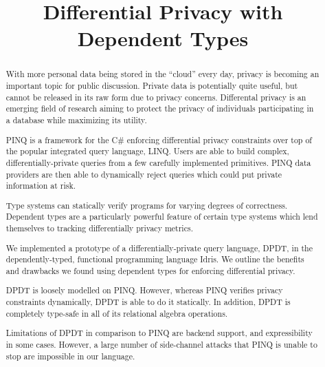 \documentclass[12pt]{report}
\title{Differential Privacy with Dependent Types}
\begin{document}
\maketitle



\graphicspath{{assets/}}

\begin{abstract}
With more personal data being stored in the ``cloud'' every day, privacy is becoming an important topic for public discussion.
Private data is potentially quite useful, but cannot be released in its raw form due to privacy concerns.
Differental privacy is an emerging field of research aiming to protect the privacy of individuals participating in a database while maximizing its utility.

PINQ is a framework for the C\# enforcing differential privacy constraints over top of the popular integrated query language, LINQ.
Users are able to build complex, differentially-private queries from a few carefully implemented primitives.
PINQ data providers are then able to dynamically reject queries which could put private information at risk.

Type systems can statically verify programs for varying degrees of correctness.
Dependent types are a particularly powerful feature of certain type systems which lend themselves to tracking differentially privacy metrics.

We implemented a prototype of a differentially-private query language, DPDT, in the dependently-typed, functional programming language Idris.
We outline the benefits and drawbacks we found using dependent types for enforcing differential privacy.

DPDT is loosely modelled on PINQ.
However, whereas PINQ verifies privacy constraints dynamically, DPDT is able to do it statically.
In addition, DPDT is completely type-safe in all of its relational algebra operations.

Limitations of DPDT in comparison to PINQ are backend support, and expressibility in some cases.
However, a large number of side-channel attacks that PINQ is unable to stop are impossible in our language.
\end{abstract}
\end{document}

